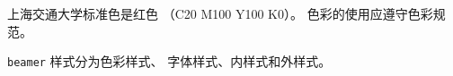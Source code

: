 \documentclass{ctexbeamer}
\begin{document}
\begin{frame}
  上海交通大学标准色是红色
  （C20 M100 Y100 K0）。
  色彩的使用应遵守色彩规范。

  \texttt{beamer} 样式分为色彩样式、
  字体样式、内样式和外样式。
\end{frame}
\end{document}
